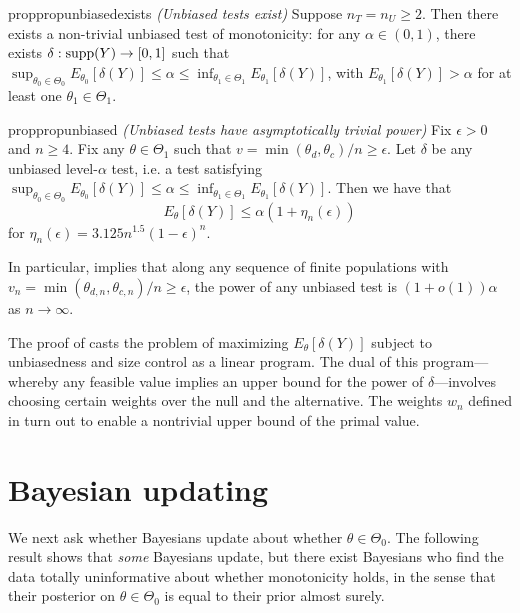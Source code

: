 \documentclass[12pt,reqno]{amsart}
\begin{document}
\begin{restatable}{prop}{propunbiasedexists} \emph{(Unbiased tests exist)}
\label{prop:unbiasedexists}
Suppose $n_T=n_U \geq 2$. Then there exists a non-trivial unbiased test of monotonicity: for any $\alpha \in (0,1)$, there exists $\delta: \operatorname{supp}(Y) \to [0,1]$ such that $\sup_{\theta_0 \in \Theta_0} E_{\theta_0}[ \delta(Y) ] \leq \alpha \leq \inf_{\theta_1 \in \Theta_1} E_{\theta_1}[ \delta(Y) ]$, with $E_{\theta_1}[ \delta(Y) ] > \alpha$ for at least one $\theta_1 \in \Theta_1$. 
\end{restatable}


\begin{restatable}{prop}{propunbiased} \emph{(Unbiased tests have asymptotically trivial power)}
\label{prop:unbiased}
    Fix $\epsilon > 0$ and $n \geq 4$. Fix any  $\theta \in \Theta_{1}$ such that $v = \min
    (\theta_{d}, \theta_{c})/n \ge \epsilon$. Let $\delta$ be any unbiased level-$\alpha$ test, i.e. a test satisfying $\sup_{\theta_0 \in \Theta_0} E_{\theta_0}[\delta(Y)] \le \alpha \le \inf_{\theta_1 \in
        \Theta_1} E_{\theta_1}[\delta(Y)].$
    Then we have that
    \[
        E_{\theta}[\delta(Y)] \le \alpha (1 + \eta_n(\epsilon))
    \]
    for $\eta_n(\epsilon) = 3.125 n^{1.5} (1-\epsilon)^n$.
\end{restatable}

In particular,  implies that along any sequence of finite populations with $v_n = \min(\theta_{d,n}, \theta_{c,n})/n \ge \epsilon$, the power of any unbiased test is $(1+o(1)) \alpha$ as $n \rightarrow \infty$.

The proof of  casts the problem of maximizing $E_{\theta}[\delta(Y)]$
subject to unbiasedness and size control as a linear program. The dual of this
program---whereby any feasible value implies an upper bound for the power of
$\delta$---involves choosing certain weights over the null and the alternative. The weights
$w_n$ defined in  turn out to enable a nontrivial upper bound of the primal value.


\section{Bayesian updating}

We next ask whether Bayesians update about whether $\theta\in\Theta_0$. The following result shows that \emph{some} Bayesians update, but there exist Bayesians who find the data totally uninformative about whether monotonicity holds, in the sense that their posterior on $\theta \in \Theta_0$ is equal to their prior almost surely.
\end{document}
